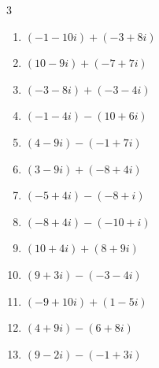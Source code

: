 \begin{multicols}{3}
\begin{enumerate}
        \phantom{$\displaystyle =10-5i$}

  \item $\displaystyle (-1-10i) + (-3+8i)$

        \phantom{$\displaystyle =-4-2i$}

  \item $\displaystyle (10-9i) + (-7+7i)$

        \phantom{$\displaystyle =3-2i$}

  \item $\displaystyle (-3-8i) + (-3-4i)$

        \phantom{$\displaystyle =-6-12i$}

  \item $\displaystyle (-1-4i) - (10+6i)$

        \phantom{$\displaystyle =-11-10i$}

  \item $\displaystyle (4-9i) - (-1+7i)$

        \phantom{$\displaystyle =5-16i$}

  \item $\displaystyle (3-9i) + (-8+4i)$

        \phantom{$\displaystyle =-5-5i$}

  \item $\displaystyle (-5+4i) - (-8+i)$

        \phantom{$\displaystyle =3+3i$}

  \item $\displaystyle (-8+4i) - (-10+i)$

        \phantom{$\displaystyle =2+3i$}

  \item $\displaystyle (10+4i) + (8+9i)$

        \phantom{$\displaystyle =18+13i$}

  \item $\displaystyle (9+3i) - (-3-4i)$

        \phantom{$\displaystyle =12+7i$}

  \item $\displaystyle (-9+10i) + (1-5i)$

        \phantom{$\displaystyle =-8+5i$}

  \item $\displaystyle (4+9i) - (6+8i)$

        \phantom{$\displaystyle =-2+i$}

  \item $\displaystyle (9-2i) - (-1+3i)$


\end{enumerate}
\end{multicols}
